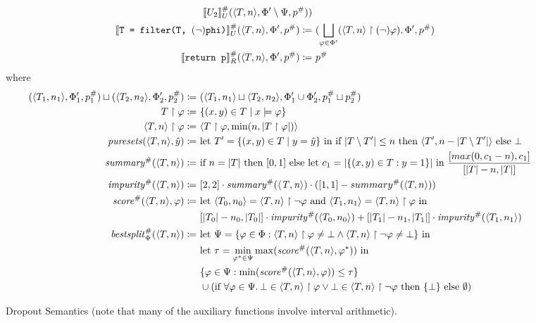 \begin{figure}
\begin{align*}
\den[U]{U_2}^\#(\langle T, n \rangle, \Phi' \setminus \Psi, p^\#)) \\
%
\den[U]{\filternode[(\lnot)]}^\#(\argtuple) \coloneqq&~
(\bigsqcup_{\varphi \in \Phi'} (\langle T, n \rangle \upharpoonright (\lnot) \varphi), \Phi', p^\#) \\
%
\den[R]{\returnnode}^\#(\argtuple) \coloneqq&~ p^\#
\end{align*}
where
\begin{align*}
(\langle T_1, n_1 \rangle, \Phi_1', p_1^\#) \sqcup (\langle T_2, n_2 \rangle, \Phi_2', p_2^\#)
\coloneqq&~
(\langle T_1, n_1 \rangle \sqcup \langle T_2, n_2 \rangle,
\Phi_1' \cup \Phi_2', p_1^\# \sqcup p_2^\#) \\
%
T \upharpoonright \varphi \coloneqq&~ \{(x,y) \in T \mid x \models \varphi\} \\
%
\langle T, n \rangle \upharpoonright \varphi \coloneqq&~
\langle T \upharpoonright \varphi, \text{min}(n, |T \upharpoonright \varphi|) \rangle \\
%
\mathit{puresets}(\langle T, n\rangle, \hat{y}) \coloneqq&~
\text{let } T' = \{(x,y) \in T \mid y = \hat{y}\} \text{ in }
\text{if } |T \setminus T'| \leq n \text{ then } \langle T', n - |T \setminus T'| \rangle
\text{ else } \bot \\
%
\mathit{summary}^\#(\langle T, n \rangle) \coloneqq&~
\text{if } n = |T| \text{ then } [0, 1] \text{ else }
\text{let } c_1 = |\{(x,y) \in T : y = 1\}| \text{ in }
\frac{[max(0, c_1 - n), c_1]}{[|T| - n, |T|]}\\
%
\mathit{impurity}^\#(\langle T, n \rangle) \coloneqq&~
[2,2] \cdot \mathit{summary^\#(\langle T, n \rangle)}
\cdot ([1,1] - summary^\#(\langle T, n \rangle)) \\
%
\mathit{score}^\#(\langle T, n \rangle, \varphi) \coloneqq&~
\text{let } \langle T_0, n_0 \rangle = \langle T, n \rangle \upharpoonright \lnot \varphi
\text{ and } \langle T_1, n_1 \rangle = \langle T, n \rangle \upharpoonright \varphi \text{ in } \\
&~[|T_0| - n_0, |T_0|] \cdot \mathit{impurity}^\#(\langle T_0, n_0 \rangle) +
[|T_1| - n_1, |T_1|] \cdot \mathit{impurity}^\#(\langle T_1, n_1 \rangle)\\
%
\mathit{bestsplit}^\#_\Phi(\langle T, n \rangle) \coloneqq&~
\text{let } \Psi = \{\varphi \in \Phi : \langle T, n \rangle \upharpoonright \varphi \neq \bot
\land \langle T, n \rangle \upharpoonright \lnot\varphi \neq \bot\} \text{ in } \\
&~\text{let } \tau = \min_{\varphi^* \in \Psi} \max(\mathit{score}^\#(\langle T, n \rangle, \varphi^*)) \text{ in } \\
&~\{\varphi \in \Psi : \min(\mathit{score}^\#(\langle T, n \rangle, \varphi)) \leq \tau\}\\
&~\cup (\text{if } \forall \varphi \in \Psi \ldotp \bot \in \langle T, n \rangle \upharpoonright \varphi
\lor \bot \in \langle T, n \rangle \upharpoonright \lnot\varphi \text{ then } \{\bot\} \text{ else } \emptyset) \\
\end{align*}
\caption{Dropout Semantics (note that many of the auxiliary functions involve interval arithmetic).}
\label{fig:abstract}
\end{figure}


